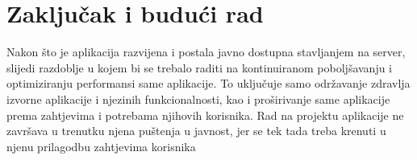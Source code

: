 \chapter{Zaključak i budući rad}
		
		Nakon što je aplikacija razvijena i postala javno dostupna stavljanjem na server, slijedi razdoblje u kojem bi se trebalo raditi na kontinuiranom poboljšavanju i optimiziranju performansi same aplikacije. To uključuje samo održavanje zdravlja izvorne aplikacije i njezinih funkcionalnosti, kao i proširivanje same aplikacije prema zahtjevima i potrebama njihovih korisnika. Rad na projektu aplikacije ne završava u trenutku njena puštenja u javnost, jer se tek tada treba krenuti u njenu prilagodbu zahtjevima korisnika
		
		\eject 